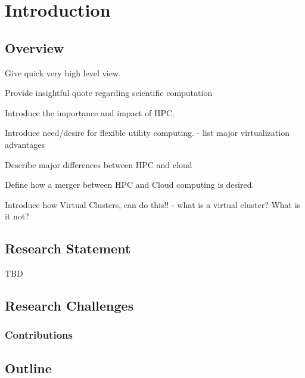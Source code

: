 
\chapter{Introduction}
\label{chap:intro}

\section{Overview}
\label{sec:overview}

Give quick very high level view. 

Provide insightful quote regarding scientific computation 

Introduce the importance and impact of HPC.

Introduce need/desire for flexible utility computing.
- list major virtualization advantages

Describe major differences between HPC and cloud

Define how a merger between HPC and Cloud computing is desired.

Introduce how Virtual Clusters, can do this!!
- what is a virtual cluster? What is it not?




\section{Research Statement}
\label{sec:stmt}

TBD

\section{Research Challenges}
\label{sec:chall}



\subsection{Contributions}



\section{Outline}
\label{sec:outline}

